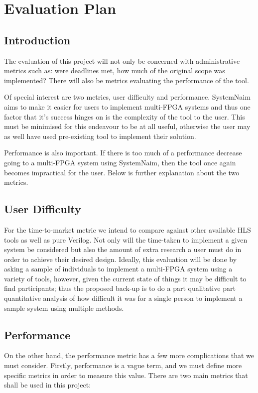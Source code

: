 \chapter{Evaluation Plan}
\label{chap:Eval}

\section{Introduction}
The evaluation of this project will not only be concerned with administrative metrics such as: were deadlines met, how much of the original scope was implemented? There will also be metrics evaluating the performance of the tool.

Of special interest are two metrics, user difficulty and performance. SystemNaim aims to make it easier for users to implement multi-FPGA systems and thus one factor that it's success hinges on is the complexity of the tool to the user. This must be minimised for this endeavour to be at all useful, otherwise the user may as well have used pre-existing tool to implement their solution.

Performance is also important. If there is too much of a performance decrease going to a multi-FPGA system using SystemNaim, then the tool once again becomes impractical for the user. Below is further explanation about the two metrics. 

\section{User Difficulty}
\label{sec:ud}
For the time-to-market metric we intend to compare against other available HLS tools as well as pure Verilog. Not only will the time-taken to implement a given system be considered but also the amount of extra research a user must do in order to achieve their desired design. Ideally, this evaluation will be done by asking a sample of individuals to implement a multi-FPGA system using a variety of tools, however, given the current state of things it may be difficult to find participants; thus the proposed back-up is to do a part qualitative part quantitative analysis of how difficult it was for a single person to implement a sample system using multiple methods.

\section{Performance}
On the other hand, the performance metric has a few more complications that we must consider. Firstly, performance is a vague term, and we must define more specific metrics in order to measure this value. There are two main metrics that shall be used in this project: 


